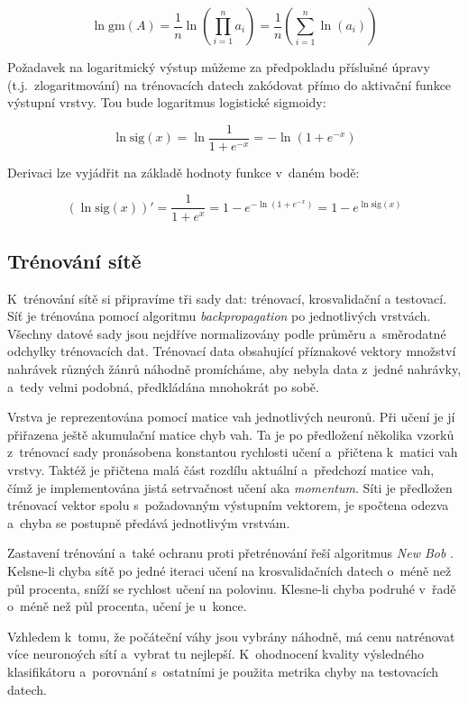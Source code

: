 \documentclass[10pt,a4paper,twocolumn]{article}
\begin{document}
$$
\ln\mbox{gm}(A)
= \frac{1}{n}\ln\left(\prod_{i=1}^na_i\right)
= \frac{1}{n}\left(\sum_{i=1}^n\ln(a_i)\right)
$$

Požadavek na logaritmický výstup můžeme za předpokladu příslušné úpravy (t.j.~zlogaritmování)
na trénovacích datech zakódovat přímo do aktivační funkce výstupní vrstvy.
Tou bude logaritmus logistické sigmoidy:

$$ \ln\mbox{sig}(x) = \ln\frac{1}{1+e^{-x}} = -\ln(1 + e^{-x}) $$

Derivaci lze vyjádřit na základě hodnoty funkce v~daném bodě:

$$ (\ln\mbox{sig}(x))' = \frac{1}{1+e^{x}} = 1-e^{-\ln(1 + e^{-x})} = 1 - e^{\ln\mathrm{sig}(x)} $$

\subsection{Trénování sítě}

K~trénování sítě si připravíme tři sady dat: trénovací, krosvalidační a testovací.
Síť je trénována pomocí algoritmu \emph{backpropagation} po jednotlivých vrstvách.
Všechny datové sady jsou nejdříve normalizovány podle průměru a~směrodatné odchylky
trénovacích dat. Trénovací data obsahující příznakové vektory množství nahrávek různých
žánrů náhodně promícháme, aby nebyla data z~jedné nahrávky, a~tedy velmi podobná,
předkládána mnohokrát po sobě.

Vrstva je reprezentována pomocí matice vah jednotlivých neuronů.
Při učení je jí přiřazena ještě akumulační matice chyb vah.
Ta je po předložení několika vzorků z~trénovací sady
pronásobena konstantou rychlosti učení a~přičtena k~matici vah vrstvy.
Taktéž je přičtena malá část rozdílu aktuální a~předchozí matice vah,
čímž je implementována jistá setrvačnost učení aka \emph{momentum}.
Síti je předložen trénovací vektor spolu s~požadovaným výstupním vektorem,
je spočtena odezva a~chyba se postupně předává jednotlivým vrstvám.

Zastavení trénování a~také ochranu proti přetrénování řeší algoritmus \emph{New Bob} \cite{newbob}.
Kelsne-li chyba sítě po jedné iteraci učení na krosvalidačních datech o~méně než půl procenta,
sníží se rychlost učení na polovinu. Klesne-li chyba podruhé v~řadě o~méně než půl procenta,
učení je u~konce.

Vzhledem k~tomu, že počáteční váhy jsou vybrány náhodně,
má cenu natrénovat více neuronoých sítí a~vybrat tu nejlepší.
K~ohodnocení kvality výsledného klasifikátoru a~porovnání s~ostatními
je použita metrika chyby na testovacích datech.
\end{document}

